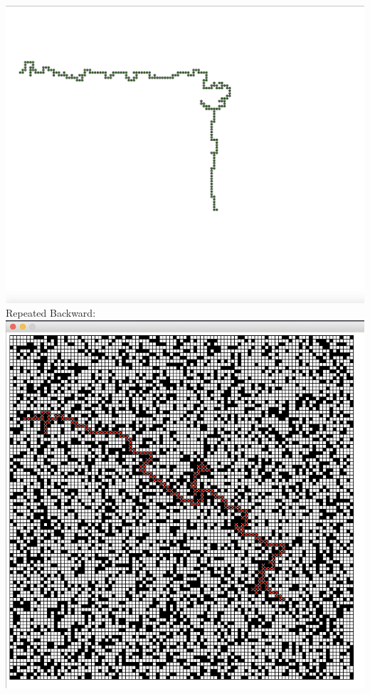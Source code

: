 \documentclass{article}
\begin{document}
\includegraphics[scale = 0.70]{forward2.PNG}
\newline
Repeated Backward:
\newline
\includegraphics[scale = 0.70]{backward.PNG}
\end{document}

